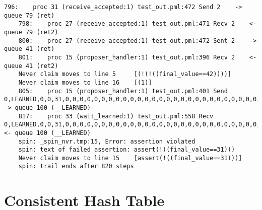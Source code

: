 \begin{lstlisting}[xleftmargin=.01\linewidth, xrightmargin=0.01\linewidth, caption={Message passing caused by the proposer's protocol bug.}, label={lst:paxos_bug}]
    796:    proc 31 (receive_accepted:1) test_out.pml:472 Send 2    -> queue 79 (ret)
    798:    proc 27 (receive_accepted:1) test_out.pml:471 Recv 2    <- queue 79 (ret2)
    800:    proc 27 (receive_accepted:1) test_out.pml:472 Sent 2    -> queue 41 (ret)
    801:    proc 15 (proposer_handler:1) test_out.pml:396 Recv 2    <- queue 41 (ret2)
    Never claim moves to line 5     [(!(!((final_value==42))))]
    Never claim moves to line 16    [(1)]
    805:    proc 15 (proposer_handler:1) test_out.pml:401 Send 0,LEARNED,0,0,31,0,0,0,0,0,0,0,0,0,0,0,0,0,0,0,0,0,0,0,0,0,0,0,0,0,0,0,0,0,0,0,0,0   -> queue 100 (__LEARNED)
    817:    proc 33 (wait_learned:1) test_out.pml:558 Recv 0,LEARNED,0,0,31,0,0,0,0,0,0,0,0,0,0,0,0,0,0,0,0,0,0,0,0,0,0,0,0,0,0,0,0,0,0,0,0,0       <- queue 100 (__LEARNED)
    spin: _spin_nvr.tmp:15, Error: assertion violated
    spin: text of failed assertion: assert(!((final_value==31)))
    Never claim moves to line 15    [assert(!((final_value==31)))]
    spin: trail ends after 820 steps
\end{lstlisting}

\section{Consistent Hash Table}
